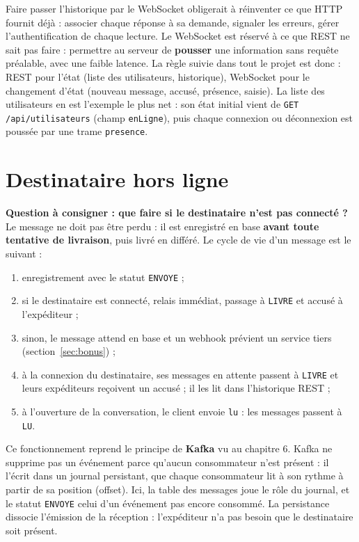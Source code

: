 \documentclass[11pt,a4paper]{article}
\newcommand{\tachesection}[1]{%
\needspace{6\baselineskip}%
\color{tachenavy}%
\section{#1}%
\color{black}%
}
\begin{document}
Faire passer l'historique par le WebSocket obligerait à réinventer ce que HTTP fournit déjà : associer chaque réponse à sa demande, signaler les erreurs, gérer l'authentification de chaque lecture. Le WebSocket est réservé à ce que REST ne sait pas faire : permettre au serveur de \textbf{pousser} une information sans requête préalable, avec une faible latence. La règle suivie dans tout le projet est donc : REST pour l'état (liste des utilisateurs, historique), WebSocket pour le changement d'état (nouveau message, accusé, présence, saisie). La liste des utilisateurs en est l'exemple le plus net : son état initial vient de \texttt{GET /api/utilisateurs} (champ \texttt{enLigne}), puis chaque connexion ou déconnexion est poussée par une trame \texttt{presence}.

\FloatBarrier
\tachesection{Destinataire hors ligne}

\textbf{Question à consigner : que faire si le destinataire n'est pas connecté ?} Le message ne doit pas être perdu : il est enregistré en base \textbf{avant toute tentative de livraison}, puis livré en différé. Le cycle de vie d'un message est le suivant :
\begin{enumerate}[topsep=4pt,itemsep=3pt]
\item enregistrement avec le statut \texttt{ENVOYE} ;
\item si le destinataire est connecté, relais immédiat, passage à \texttt{LIVRE} et accusé à l'expéditeur ;
\item sinon, le message attend en base et un webhook prévient un service tiers (section~\ref{sec:bonus}) ;
\item à la connexion du destinataire, ses messages en attente passent à \texttt{LIVRE} et leurs expéditeurs reçoivent un accusé ; il les lit dans l'historique REST ;
\item à l'ouverture de la conversation, le client envoie \texttt{lu} : les messages passent à \texttt{LU}.
\end{enumerate}

Ce fonctionnement reprend le principe de \textbf{Kafka} vu au chapitre 6. Kafka ne supprime pas un événement parce qu'aucun consommateur n'est présent : il l'écrit dans un journal persistant, que chaque consommateur lit à son rythme à partir de sa position (offset). Ici, la table des messages joue le rôle du journal, et le statut \texttt{ENVOYE} celui d'un événement pas encore consommé. La persistance dissocie l'émission de la réception : l'expéditeur n'a pas besoin que le destinataire soit présent.
\end{document}

